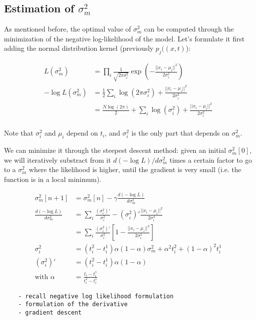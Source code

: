 \documentclass{article}
\begin{document}
\subsection{Estimation of $\sigma_m^2$}

As mentioned before, the optimal value of $\sigma_m^2$ can be computed through the minimization of the negative log-likelihood of the model. Let's formulate it first adding the normal distribution kernel (previously $p_j((x,t)$):

\begin{align*}
    L(\sigma_m^2) &= \prod_i \frac{1}{\sqrt{2\pi\sigma_i^2}} \exp \left( -\frac{||x_i-\mu_i||^2}{2\sigma_i^2} \right) \\
    -\log L(\sigma_m^2) &= \frac{1}{2} \sum_i \log(2\pi\sigma_i^2) + \frac{||x_i-\mu_i||^2}{2\sigma_i^2} \\
    &= \frac{N\log(2\pi)}{2} + \sum_i \log(\sigma_i^2) + \frac{||x_i-\mu_i||^2}{2\sigma_i^2} \\
\end{align*}

Note that $\sigma_i^2$ and $\mu_i$ depend on $t_i$, and $\sigma_i^2$ is the only part that depends on $\sigma_m^2$.

We can minimize it through the steepest descent method: given an initial $\sigma_m^2[0]$, we will iteratively substract from it $d(-\log L)/d\sigma_m^2$ times a certain factor to go to a $\sigma_m^2$ where the likelihood is higher, until the gradient is very small (i.e. the function is in a local minimum).

\begin{align*}
    \sigma_m^2[n+1] &= \sigma_m^2[n] - \gamma \frac{d(-\log L)}{d\sigma_m^2} \\
    \frac{d(-\log L)}{d\sigma_m^2} &= \sum_i \frac{(\sigma_i^2)'}{\sigma_i^2} - (\sigma_i^2)'\frac{||x_i - \mu_i||^2}{2\sigma_i^4} \\
    &= \sum_i \frac{(\sigma_i^2)'}{\sigma_i^2} \left[ 1 -  \frac{||x_i - \mu_i||^2}{2\sigma_i^2} \right]\\
    \sigma_i^2 &= (t_i^2-t_i^1)\alpha(1-\alpha)\sigma_m^2 + \alpha^2t_i^2 + (1-\alpha)^2t_i^1 \\
    (\sigma_i^2)' &= (t_i^2-t_i^1)\alpha(1-\alpha) \\
    \text{with } \alpha &= \frac{t_i - t_i^1}{t_i^2 - t_i^1}
\end{align*}

\begin{verbatim}
    - recall negative log likelihood formulation
    - formulation of the derivative
    - gradient descent
\end{verbatim}
\end{document}

